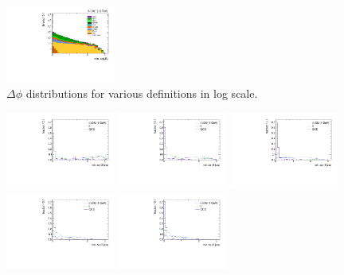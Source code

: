 \begin{figure}[htbp]
  \includegraphics[width=0.32\textwidth]{figures/hadronic-incl-dphijetmetlog.pdf}
  \caption{$\Delta\phi$ distributions for various definitions in log scale.}
  \label{fig:hadronic_dphijetmetlog}
\end{figure}

\begin{figure}[htbp]
  \centering
  \includegraphics[width=0.32\textwidth]{figures/hadronic-overlay-dphijetmet2.pdf}
  \includegraphics[width=0.32\textwidth]{figures/hadronic-overlay-dphijetmet3.pdf}
  \includegraphics[width=0.32\textwidth]{figures/hadronic-overlay-dphijetmet4.pdf} \\
  \includegraphics[width=0.32\textwidth]{figures/hadronic-overlay-dphijetmet5.pdf}
  \includegraphics[width=0.32\textwidth]{figures/hadronic-overlay-dphijetmet6.pdf}

\end{figure}
